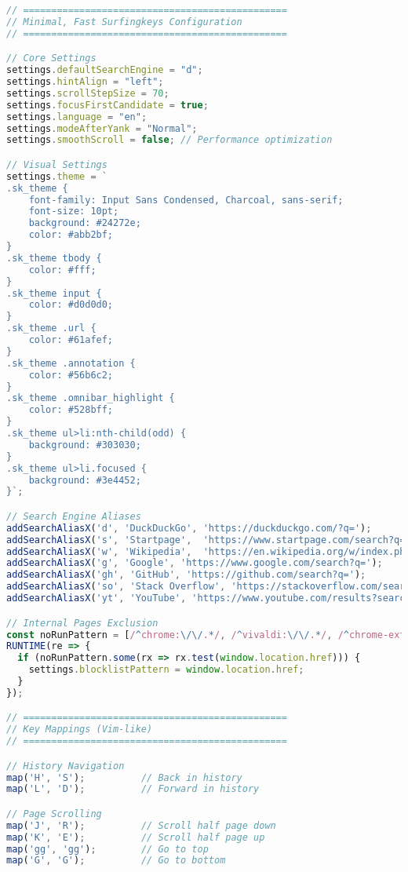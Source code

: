 \documentclass[11pt,a4paper,oneside]{book}
\begin{document}
\begin{codebox}
\begin{lstlisting}[language=JavaScript]
// ===============================================
// Minimal, Fast Surfingkeys Configuration
// ===============================================

// Core Settings
settings.defaultSearchEngine = "d";
settings.hintAlign = "left";
settings.scrollStepSize = 70;
settings.focusFirstCandidate = true;
settings.language = "en";
settings.modeAfterYank = "Normal";
settings.smoothScroll = false; // Performance optimization

// Visual Settings
settings.theme = `
.sk_theme {
    font-family: Input Sans Condensed, Charcoal, sans-serif;
    font-size: 10pt;
    background: #24272e;
    color: #abb2bf;
}
.sk_theme tbody {
    color: #fff;
}
.sk_theme input {
    color: #d0d0d0;
}
.sk_theme .url {
    color: #61afef;
}
.sk_theme .annotation {
    color: #56b6c2;
}
.sk_theme .omnibar_highlight {
    color: #528bff;
}
.sk_theme ul>li:nth-child(odd) {
    background: #303030;
}
.sk_theme ul>li.focused {
    background: #3e4452;
}`;

// Search Engine Aliases
addSearchAliasX('d', 'DuckDuckGo', 'https://duckduckgo.com/?q=');
addSearchAliasX('s', 'Startpage',  'https://www.startpage.com/search?q=');
addSearchAliasX('w', 'Wikipedia',  'https://en.wikipedia.org/w/index.php?search=');
addSearchAliasX('g', 'Google', 'https://www.google.com/search?q=');
addSearchAliasX('gh', 'GitHub', 'https://github.com/search?q=');
addSearchAliasX('so', 'Stack Overflow', 'https://stackoverflow.com/search?q=');
addSearchAliasX('yt', 'YouTube', 'https://www.youtube.com/results?search_query=');

// Internal Pages Exclusion
const noRunPattern = [/^chrome:\/\/.*/, /^vivaldi:\/\/.*/, /^chrome-extension:\/\/.*/];
RUNTIME(re => {
  if (noRunPattern.some(rx => rx.test(window.location.href))) {
    settings.blocklistPattern = window.location.href;
  }
});

// ===============================================
// Key Mappings (Vim-like)
// ===============================================

// History Navigation
map('H', 'S');          // Back in history
map('L', 'D');          // Forward in history

// Page Scrolling
map('J', 'R');          // Scroll half page down
map('K', 'E');          // Scroll half page up
map('gg', 'gg');        // Go to top
map('G', 'G');          // Go to bottom


\end{lstlisting}
\end{codebox}
\end{document}
